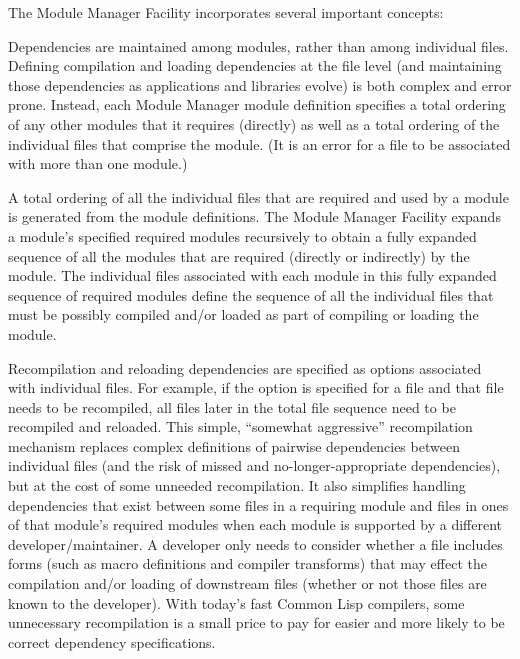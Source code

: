 \documentclass[10pt,twoside,english,pdftex]{article}
\begin{document}
The Module Manager Facility incorporates several important concepts:
\begin{tightitemize}
%
\item Dependencies are maintained among modules, rather than among individual
  files.  Defining compilation and loading dependencies at the file level (and
  maintaining those dependencies as applications and libraries evolve) is both
  complex and error prone.  Instead, each Module Manager module definition
  specifies a total ordering of any other modules that it requires (directly)
  as well as a total ordering of the individual files that comprise the
  module.  (It is an error for a file to be associated with more than one
  module.)  
%
\item A total ordering of all the individual files that are required and used
  by a module is generated from the module definitions.  The Module Manager
  Facility expands a module's specified required modules recursively to obtain
  a fully expanded sequence of all the modules that are required (directly or
  indirectly) by the module.  The individual files associated with each module
  in this fully expanded sequence of required modules define the sequence of
  all the individual files that must be possibly compiled and/or loaded as
  part of compiling or loading the module.
%
\item Recompilation and reloading dependencies are specified as options
  associated with individual files.  For example, if the option
   is specified for a file and that file needs
  to be recompiled, all files later in the total file sequence need to be
  recompiled and reloaded.  This simple, ``somewhat aggressive'' recompilation
  mechanism replaces complex definitions of pairwise dependencies between
  individual files (and the risk of missed and no-longer-appropriate
  dependencies), but at the cost of some unneeded recompilation.  It also
  simplifies handling dependencies that exist between some files in a
  requiring module and files in ones of that module's required modules when
  each module is supported by a different developer/maintainer.  A developer
  only needs to consider whether a file includes forms (such as macro
  definitions and compiler transforms) that may effect the compilation and/or
  loading of downstream files (whether or not those files are known to the
  developer). With today's fast Common Lisp compilers, some unnecessary
  recompilation is a small price to pay for easier and more likely to be
  correct dependency specifications.

\end{tightitemize}
\end{document}

